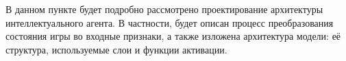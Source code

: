 В данном пункте будет подробно рассмотрено проектирование архитектуры интеллектуального агента. В частности, будет описан процесс преобразования состояния игры во входные признаки, а также изложена архитектура модели: её структура, используемые слои и функции активации.